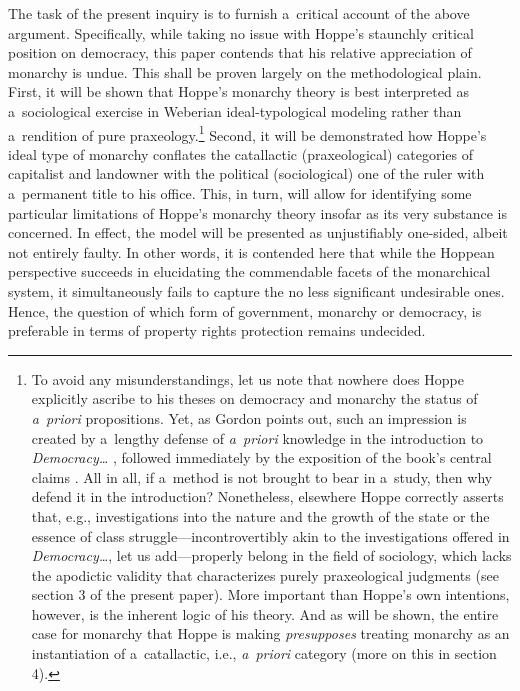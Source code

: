 The task of the present inquiry is to furnish a~critical account of the above argument. Specifically, while taking no issue with Hoppe's staunchly critical position on democracy, this paper contends that his relative appreciation of monarchy is undue. This shall be proven largely on the methodological plain. First, it will be shown that Hoppe's monarchy theory is best interpreted as a~sociological exercise in Weberian ideal-typological modeling rather than a~rendition of pure praxeology.\footnote{To avoid any misunderstandings, let us note that nowhere does Hoppe explicitly ascribe to his theses on democracy and monarchy the status of \textit{a~priori} propositions. Yet, as Gordon 
\parencite*[][pp.98–99]{gordon_austro-libertarian_2017} %
 points out, such an impression is created by a~lengthy defense of \textit{a~priori} knowledge in the introduction to \textit{Democracy…} 
\parencite[][pp.xv–xix]{hoppe_democracy_2007}, %
 followed immediately by the exposition of the book's central claims 
\parencite[][pp.xix–xxi]{hoppe_democracy_2007}. %
 All in all, if a~method is not brought to bear in a~study, then why defend it in the introduction? Nonetheless, elsewhere Hoppe 
\parencites*[][p.33]{hoppe_economics_2006}[][p.16]{hoppe_short_2015} %
 correctly asserts that, e.g., investigations into the nature and the growth of the state or the essence of class struggle---incontrovertibly akin to the investigations offered in \textit{Democracy…}, let us add---properly belong in the field of sociology, which lacks the apodictic validity that characterizes purely praxeological judgments (see section 3 of the present paper). More important than Hoppe's own intentions, however, is the inherent logic of his theory. And as will be shown, the entire case for monarchy that Hoppe is making \textit{presupposes} treating monarchy as an instantiation of a~catallactic, i.e., \textit{a~priori} category (more on this in section 4). } Second, it will be demonstrated how Hoppe's ideal type of monarchy conflates the catallactic (praxeological) categories of capitalist and landowner with the political (sociological) one of the ruler with a~permanent title to his office. This, in turn, will allow for identifying some particular limitations of Hoppe's monarchy theory insofar as its very substance is concerned. In effect, the model will be presented as unjustifiably one-sided, albeit not entirely faulty. In other words, it is contended here that while the Hoppean perspective succeeds in elucidating the commendable facets of the monarchical system, it simultaneously fails to capture the no less significant undesirable ones. Hence, the question of which form of government, monarchy or democracy, is preferable in terms of property rights protection remains undecided.




